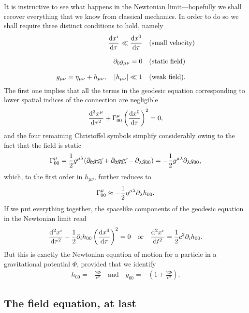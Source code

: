 It is instructive to see what happens in the Newtonian limit---hopefully we shall
recover everything that we know from classical mechanics. In order to do so we shall
require three distinct conditions to hold, namely
\begin{align*}
  \dv{x^i}{\tau} \ll \dv{x^0}{\tau} & \quad\text{(small velocity)}\\[8pt]
  \partial_{0}g_{\mu\nu} = 0 & \quad\text{(static field)}\\[8pt]
  g_{\mu\nu} = \eta_{\mu\nu} + h_{\mu\nu}, \quad \abs{h_{\mu\nu}} \ll 1 & \quad\text{(weak field)}.
\end{align*}
The first one implies that all the terms in the geodesic equation corresponding
to lower spatial indices of the connection are negligible
\begin{align*}
  \dv[2]{x^\mu}{\tau} + \Gamma^{\mu}_{00}\left( \dv{x^0}{\tau} \right)^2 = 0,
\end{align*}
and the four remaining Christoffel symbols simplify considerably owing to the fact
that the field is static
\begin{align*}
  \Gamma^{\mu}_{00} =
  \frac{1}{2}g^{\mu\lambda} (\cancel{\partial_{0}g_{\lambda 0}} + \cancel{\partial_{0}g_{0\lambda}} -
  \partial_{\lambda}g_{00}) =
  -\frac{1}{2}g^{\mu\lambda}\partial_{\lambda}g_{00},
\end{align*}
which, to the first order in $h_{\mu\nu}$, further reduces to
\begin{align*}
  \Gamma^{\mu}_{00} \approx -\frac{1}{2}\eta^{\mu\lambda}\partial_{\lambda}h_{00}.
\end{align*}
If we put everything together, the spacelike components of the geodesic equation
in the Newtonian limit read
\begin{align*}
  \dv[2]{x^i}{\tau} - \frac{1}{2} \partial_{i}h_{00} \left( \dv{x^0}{\tau} \right)^2 = 0
  \quad\text{or}\quad
  \dv[2]{x^i}{t} = \frac{1}{2} c^2 \partial_{i} h_{00}.
\end{align*}
But this is exactly the Newtonian equation of motion for a particle in a gravitational
potential $\Phi$, provided that we identify
\begin{align}
  h_{00} = -\frac{2\Phi}{c^2} \quad\text{and}\quad g_{00} =
  -\left(1 +  \frac{2\Phi}{c^2}\right).
\end{align}



\subsection{The field equation, at last}

